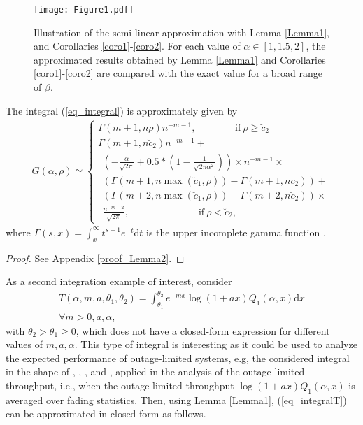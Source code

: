 \begin{figure}
\centering
  \texttt{[image: Figure1.pdf]}\\
\caption{Illustration of the semi-linear approximation with Lemma \ref{Lemma1}, and Corollaries \ref{coro1}-\ref{coro2}. For each value of $\alpha\in[1,1.5,2]$, the approximated results obtained by Lemma \ref{Lemma1} and Corollaries \ref{coro1}-\ref{coro2} are compared with the exact value for a broad range of $\beta$.}
\label{fig_CDFilu}
\end{figure}

\begin{lem}\label{Lemma2}
The integral (\ref{eq_integral}) is approximately given by
\begin{align}
G(\alpha,\rho)\simeq
\begin{cases}
\Gamma(m+1,n\rho)n^{-m-1}, ~~~~~~~~~~~~~~~~~~\mathrm{if}~  \rho \geq \breve{c}_2  \\ 
\Gamma(m+1,n\breve{c}_2)n^{-m-1} + \\
~~\left(-\frac{\alpha}{\sqrt{2\pi}}+0.5*\left(1-\frac{1}{\sqrt{2\pi\alpha^2}}\right)\right)\times n^{-m-1}\times\\
~~\left(\Gamma(m+1,n\max(\breve{c}_1,\rho))-\Gamma(m+1,n\breve{c}_2)\right)+\\
~~\left(\Gamma(m+2,n\max(\breve{c}_1,\rho))-\Gamma(m+2,n\breve{c}_2)\right)\times\\
~~\frac{n^{-m-2}}{\sqrt{2\pi}},
~~~~~~~~~~~~~~~~~~~~~~~~~~~~~~~~\mathrm{if}~  \rho<\breve{c}_2,
\end{cases}
\end{align}
where $\Gamma(s,x) = \int_{x}^{\infty} t^{s-1}e^{-t} \mathrm{d}t$ is the upper incomplete gamma function \cite[Eq. 6.5.1]{abramowitz1999ia}.
\end{lem}
\begin{proof}
See Appendix \ref{proof_Lemma2}. 
\end{proof}









As a second integration example of interest, consider
\begin{align}\label{eq_integralT}
    T(\alpha,m,a,\theta_1,\theta_2) = \int_{\theta_1}^{\theta_2} e^{-mx}\log(1+ax)Q_1(\alpha,x)\text{d}x \nonumber\\\forall m>0,a,\alpha,
\end{align}
with $\theta_2>\theta_1\geq0$, which does not have a closed-form expression for different values of $m, a, \alpha$. This type of integral is interesting as it could be used to analyze the expected performance of outage-limited systems, e.g,  the considered integral in the shape of \cite[eq. (1) (13)]{Simon2003TWCsome}, \cite[eq. (2)]{Cao2016CLsolutions}, \cite[eq. (3)]{Cui2012ELtwo}, and \cite[eq. (1)]{Gaur2003TVTsome}, applied in the analysis of the outage-limited throughput, i.e., when the outage-limited throughput $\log(1+ax)Q_1(\alpha,x)$  \cite[p. 2631]{Biglieri1998TITfading}\cite[Theorem 6]{Verdu1994TITgeneral}\cite[Eq. (9)]{Makki2014TCperformance} is averaged over fading statistics. Then, using Lemma \ref{Lemma1}, (\ref{eq_integralT}) can be approximated in closed-form as follows.

